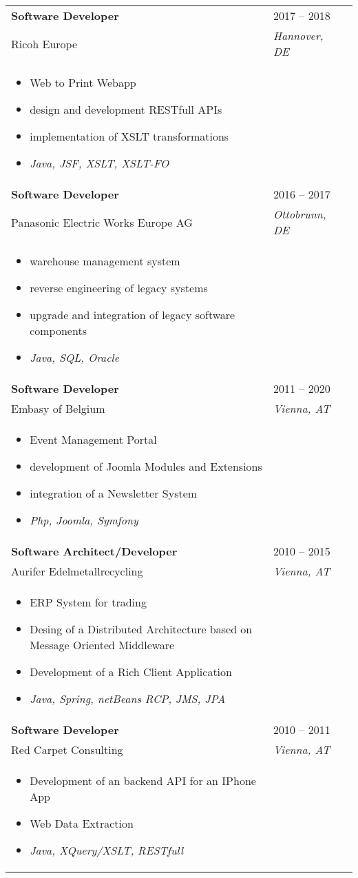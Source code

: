 \documentclass[letterpaper,11pt]{article}
\newcommand{\resumeItem}{
  \item{
    {\vspace{-2pt}}
  }
}
\newcommand{\resumeSubItem}{\resumeItem \vspace{-4pt} \small}
\begin{document}
\begin{longtable}{L{0.70\textwidth} R{0.25\textwidth} R{0.05\textwidth}}
\textbf{Software Developer} & 2017 -- 2018\\
Ricoh Europe& \textit{Hannover, DE} \\
\begin{itemize}
     \resumeItem Web to Print Webapp
     \resumeSubItem design and development RESTfull APIs
	 \resumeSubItem implementation of XSLT transformations
     \resumeSubItem \textit{Java, JSF, XSLT, XSLT-FO}
 \end{itemize} & \\

\textbf{Software Developer} & 2016 -- 2017\\
Panasonic Electric Works Europe AG & \textit{Ottobrunn, DE} \\
\begin{itemize}
     \resumeItem warehouse management system
     \resumeSubItem reverse engineering of legacy systems
	 \resumeSubItem upgrade and integration of legacy software components
     \resumeSubItem \textit{Java, SQL, Oracle}
\end{itemize} & \\

\textbf{Software Developer} & 2011 -- 2020\\
Embasy of Belgium & \textit{Vienna, AT}\\
\begin{itemize}
     \resumeItem Event Management Portal
     \resumeSubItem development of Joomla Modules and Extensions
	 \resumeSubItem integration of a Newsletter System
	 \resumeSubItem \textit{Php, Joomla, Symfony}
 \end{itemize} & \\

\textbf{Software Architect/Developer} & 2010 -- 2015\\
Aurifer Edelmetallrecycling & \textit{Vienna, AT}\\
\begin{itemize}
     \resumeItem ERP System for trading
     \resumeSubItem Desing of a Distributed Architecture based on Message Oriented Middleware
	 \resumeSubItem Development of a Rich Client Application
	 \resumeSubItem \textit{Java, Spring, netBeans RCP, JMS, JPA}
 \end{itemize} & \\

\textbf{Software Developer} & 2010 -- 2011\\
Red Carpet Consulting & \textit{Vienna, AT}\\
\begin{itemize}
     \resumeItem Development of an backend API for an IPhone App
     \resumeSubItem Web Data Extraction
	 \resumeSubItem \textit{Java, XQuery/XSLT, RESTfull}
 \end{itemize} & \\


\end{longtable}
\end{document}
